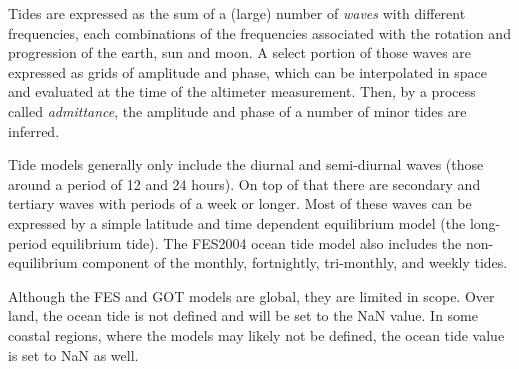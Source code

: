 \documentclass[a4paper,11pt,openany,natbib]{thesis}
\begin{document}
Tides are expressed as the sum of a (large) number of \emph{waves} with different frequencies, each combinations of the frequencies associated with the rotation and progression of the earth, sun and moon. A select portion of those waves are expressed as grids of amplitude and phase, which can be interpolated in space and evaluated at the time of the altimeter measurement. Then, by a process called \emph{admittance}, the amplitude and phase of a number of minor tides are inferred.

Tide models generally only include the diurnal and semi-diurnal waves (those around a period of 12 and 24 hours). On top of that there are secondary and tertiary waves with periods of a week or longer. Most of these waves can be expressed by a simple latitude and time dependent equilibrium model (the long-period equilibrium tide). The FES2004 ocean tide model also includes the non-equilibrium component of the monthly, fortnightly, tri-monthly, and weekly tides.

Although the FES and GOT models are global, they are limited in scope. Over land, the ocean tide is not defined and will be set to the NaN value. In some coastal regions, where the models may likely not be defined, the ocean tide value is set to NaN as well.
\end{document}

